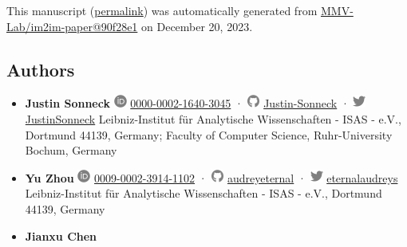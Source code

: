 This manuscript
(\href{https://MMV-Lab.github.io/im2im-paper/v/90f28e1fb1cc918aed174bcec72e566f71336385/}{permalink})
was automatically generated
from \href{https://github.com/MMV-Lab/im2im-paper/tree/90f28e1fb1cc918aed174bcec72e566f71336385}{MMV-Lab/im2im-paper@90f28e1}
on December 20, 2023.

\hypertarget{authors}{%
\subsection{Authors}\label{authors}}

\begin{itemize}
\item
  \textbf{Justin Sonneck}
  \includegraphics[width=0.16667in,height=0.16667in]{images/orcid.svg}
  \href{https://orcid.org/0000-0002-1640-3045}{0000-0002-1640-3045}
  · \includegraphics[width=0.16667in,height=0.16667in]{images/github.svg}
  \href{https://github.com/Justin-Sonneck}{Justin-Sonneck}
  · \includegraphics[width=0.16667in,height=0.16667in]{images/twitter.svg}
  \href{https://twitter.com/JustinSonneck}{JustinSonneck}
  Leibniz-Institut für Analytische Wissenschaften - ISAS - e.V., Dortmund 44139, Germany; Faculty of Computer Science, Ruhr-University Bochum, Germany
\item
  \textbf{Yu Zhou}
  \includegraphics[width=0.16667in,height=0.16667in]{images/orcid.svg}
  \href{https://orcid.org/0009-0002-3914-1102}{0009-0002-3914-1102}
  · \includegraphics[width=0.16667in,height=0.16667in]{images/github.svg}
  \href{https://github.com/audreyeternal}{audreyeternal}
  · \includegraphics[width=0.16667in,height=0.16667in]{images/twitter.svg}
  \href{https://twitter.com/eternalaudreys}{eternalaudreys}
  Leibniz-Institut für Analytische Wissenschaften - ISAS - e.V., Dortmund 44139, Germany
\item
  \textbf{Jianxu Chen}

\end{itemize}
